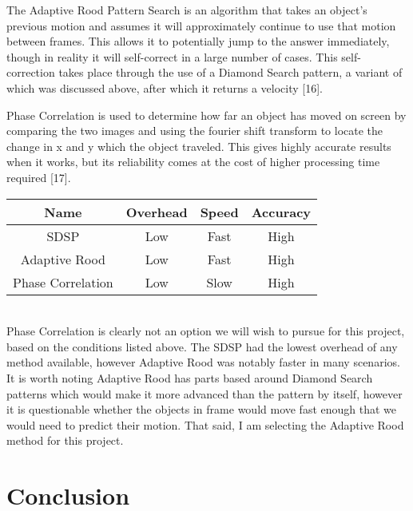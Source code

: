 \documentclass[letterpaper,10pt,onecolumn,draftclsnofoot]{IEEEtran}
\begin{document}
The Adaptive Rood Pattern Search is an algorithm that takes an object's previous motion and assumes it will approximately continue to use that motion between frames.  This allows it to potentially jump to the answer immediately, though in reality it will self-correct in a large number of cases.  This self-correction takes place through the use of a Diamond Search pattern, a variant of which was discussed above, after which it returns a velocity [16].

Phase Correlation is used to determine how far an object has moved on screen by comparing the two images and using the fourier shift transform to locate the change in x and y which the object traveled.  This gives highly accurate results when it works, but its reliability comes at the cost of higher processing time required [17].

\begin{tabular}{|c|c|c|c|}
  \hline
  \textbf{Name} & \textbf{Overhead} & \textbf{Speed} & \textbf{Accuracy} \\
  \hline
  SDSP & Low & Fast & High \\ 
  \hline
  Adaptive Rood & Low & Fast & High  \\ 
  \hline
  Phase Correlation & Low & Slow & High \\ 
  \hline
\end{tabular} \\

Phase Correlation is clearly not an option we will wish to pursue for this project, based on the conditions listed above.  The SDSP had the lowest overhead of any method available, however Adaptive Rood was notably faster in many scenarios.  It is worth noting Adaptive Rood has parts based around Diamond Search patterns which would make it more advanced than the pattern by itself, however it is questionable whether the objects in frame would move fast enough that we would need to predict their motion.  That said, I am selecting the Adaptive Rood method for this project.

\newpage
\section{Conclusion}
\end{document}

